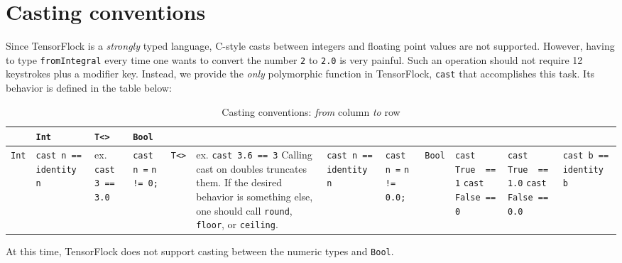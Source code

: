 \section{Casting conventions}%
\label{sec:casting_conventions}

Since TensorFlock is a \emph{strongly} typed language, C-style casts between
integers and floating point values are not supported. However, having to type
\verb|fromIntegral| every time one wants to convert the number \verb|2| to
\verb|2.0| is very painful. Such an operation should not require 12 keystrokes
plus a modifier key. Instead, we provide the \emph{only} polymorphic function
in TensorFlock, \verb|cast| that accomplishes this task. Its behavior is
defined in the table below:

\begin{table}[h]
    \centering
    \caption{Casting conventions: \emph{from} column \emph{to} row}
    \label{tab:label}
    \begin{tabular}{|p{.9cm}||p{5.5cm}|p{5cm}|p{4.5cm}|}
        \hline
        & \verb|Int| & \verb|T<>| & \verb|Bool| \\
        \hline
        \verb|Int| & \verb|cast n == identity n|& ex. \verb|cast 3 == 3.0| & 
        \verb|cast n =| \verb|n != 0;| & 
        \hline
        \verb|T<>| & ex. \verb|cast 3.6 == 3|
                   \newline Calling cast on doubles truncates them. If the
                   desired behavior is something else, one should call \verb|round|,
                   \verb|floor|, or \verb|ceiling|.  
                   & \verb|cast n == identity n| &
                   \verb|cast n =| \verb|n != 0.0;|&
        \hline
        \verb|Bool| & \verb|cast True  == 1| \newline \verb|cast False == 0| &
                      \verb|cast True  == 1.0| \newline \verb|cast False == 0.0| &
                      \verb|cast b ==| \verb|identity b| \\
        \hline
    \end{tabular}
\end{table}
\noindent At this time, TensorFlock does not support casting between the numeric types
and \verb|Bool|. 
